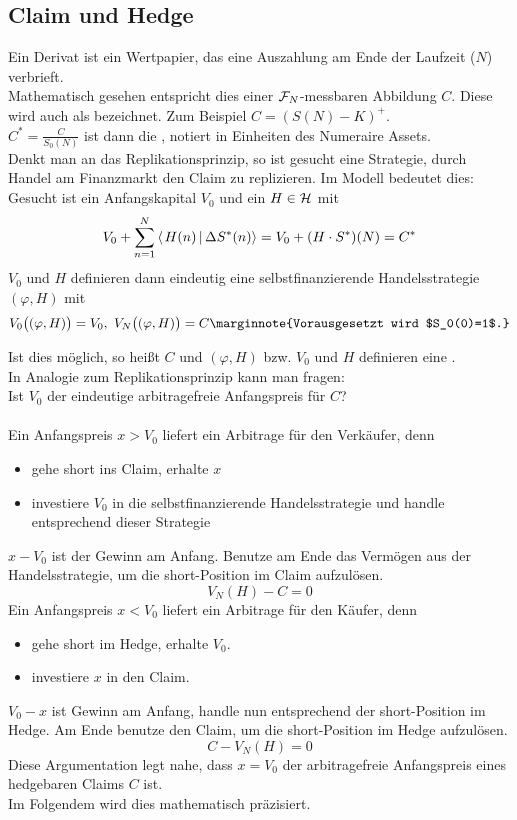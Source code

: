\subsection{Claim und Hedge}
\label{sub:claim_hedge}
Ein Derivat ist ein Wertpapier, das eine Auszahlung am Ende der Laufzeit ($N$) verbrieft.\\
Mathematisch gesehen entspricht dies einer $\mathcal{F}_N$-messbaren Abbildung $C$.
Diese wird auch als  bezeichnet.
Zum Beispiel $C=(S(N)-K)^+$.\\
$C^*=\frac{C}{S_0(N)}$ ist dann die , notiert in Einheiten des Numeraire Assets.\\
Denkt man an das Replikationsprinzip, so ist gesucht eine Strategie, durch Handel am Finanzmarkt den Claim zu replizieren.
Im Modell bedeutet dies:\\
Gesucht ist ein Anfangskapital $V_0$ und ein $H\in \mathcal{H}$ mit 
\[
V_0+\sum_{n=1}^{N}\sprod{H(n)}{\Delta S^*(n)}=V_0+(H\cdot S^*)(N)=C^*
\]
$V_0$ und $H$ definieren dann eindeutig eine selbstfinanzierende Handelsstrategie $(\varphi,H)$ mit
\[
V_0\big((\varphi,H)\big)=V_0,~ V_N\big((\varphi,H)\big)=C\marginnote{Vorausgesetzt wird $S_0(0)=1$.}
\]

Ist dies möglich, so heißt $C$  und $(\varphi,H)$ bzw. $V_0$ und $H$ definieren eine .\\
In Analogie zum Replikationsprinzip kann man fragen:\\
Ist $V_0$ der eindeutige arbitragefreie Anfangspreis für $C$?\\

\\
Ein Anfangspreis $x>V_0$ liefert ein Arbitrage für den Verkäufer, denn 
\begin{itemize}
	\item gehe short ins Claim, erhalte $x$
	\item investiere $V_0$ in die selbstfinanzierende Handelsstrategie und handle entsprechend dieser Strategie
\end{itemize}
$x-V_0$ ist der Gewinn am Anfang.
Benutze am Ende das Vermögen aus der Handelsstrategie, um die short-Position im Claim aufzulösen.
\[
V_N(H)-C=0
\]
Ein Anfangspreis $x<V_0$ liefert ein Arbitrage für den Käufer, denn
\begin{itemize}
	\item gehe short im Hedge, erhalte $V_0$.
	\item investiere $x$ in den Claim.
\end{itemize}
$V_0-x$ ist Gewinn am Anfang, handle nun entsprechend der short-Position im Hedge.
Am Ende benutze den Claim, um die short-Position im Hedge aufzulösen.
\[
C-V_N(H)=0
\]
Diese Argumentation legt nahe, dass $x=V_0$ der arbitragefreie Anfangspreis eines hedgebaren Claims $C$ ist.\\
Im Folgendem wird dies mathematisch präzisiert.

